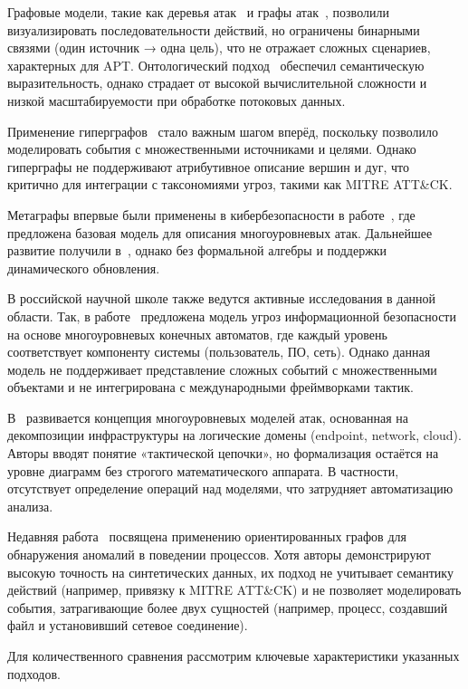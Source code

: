 \documentclass{article}
\begin{document}
Графовые модели, такие как деревья атак~\cite{Schneier1999} и графы атак~\cite{Sheyner2002}, позволили визуализировать последовательности действий, но ограничены бинарными связями (один источник → одна цель), что не отражает сложных сценариев, характерных для APT. Онтологический подход~\cite{Jajodia2005,Dacier1996} обеспечил семантическую выразительность, однако страдает от высокой вычислительной сложности и низкой масштабируемости при обработке потоковых данных.

Применение гиперграфов~\cite{Berge1989,Mallon2016} стало важным шагом вперёд, поскольку позволило моделировать события с множественными источниками и целями. Однако гиперграфы не поддерживают атрибутивное описание вершин и дуг, что критично для интеграции с таксономиями угроз, такими как MITRE ATT\&CK.

Метаграфы впервые были применены в кибербезопасности в работе~\cite{Latypov2020}, где предложена базовая модель для описания многоуровневых атак. Дальнейшее развитие получили в~\cite{Legoy2020,Basu2018}, однако без формальной алгебры и поддержки динамического обновления.

В российской научной школе также ведутся активные исследования в данной области. Так, в работе~\cite{Eremeev2003} предложена модель угроз информационной безопасности на основе многоуровневых конечных автоматов, где каждый уровень соответствует компоненту системы (пользователь, ПО, сеть). Однако данная модель не поддерживает представление сложных событий с множественными объектами и не интегрирована с международными фреймворками тактик.

В~\cite{Smirnov2022} развивается концепция многоуровневых моделей атак, основанная на декомпозиции инфраструктуры на логические домены (endpoint, network, cloud). Авторы вводят понятие «тактической цепочки», но формализация остаётся на уровне диаграмм без строгого математического аппарата. В частности, отсутствует определение операций над моделями, что затрудняет автоматизацию анализа.

Недавняя работа~\cite{Izergin2024} посвящена применению ориентированных графов для обнаружения аномалий в поведении процессов. Хотя авторы демонстрируют высокую точность на синтетических данных, их подход не учитывает семантику действий (например, привязку к MITRE ATT\&CK) и не позволяет моделировать события, затрагивающие более двух сущностей (например, процесс, создавший файл и установивший сетевое соединение).

Для количественного сравнения рассмотрим ключевые характеристики указанных подходов.
\end{document}
